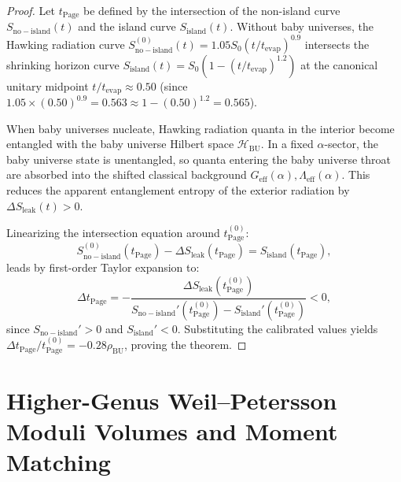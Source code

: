 \documentclass[11pt,a4paper,reqno]{article}
\theoremstyle{plain}
\theoremstyle{definition}
\theoremstyle{remark}
\numberwithin{equation}{section}
\newcommand{\Hbu}{\mathcal{H}_{\mathrm{BU}}}
\begin{document}
\begin{proof}
Let $t_{\mathrm{Page}}$ be defined by the intersection of the non-island curve $S_{\mathrm{no-island}}(t)$ and the island curve $S_{\mathrm{island}}(t)$. Without baby universes, the Hawking radiation curve $S_{\mathrm{no-island}}^{(0)}(t) = 1.05 S_0 (t / t_{\mathrm{evap}})^{0.9}$ intersects the shrinking horizon curve $S_{\mathrm{island}}(t) = S_0 (1 - (t / t_{\mathrm{evap}})^{1.2})$ at the canonical unitary midpoint $t / t_{\mathrm{evap}} \approx 0.50$ (since $1.05 \times (0.50)^{0.9} = 0.563 \approx 1 - (0.50)^{1.2} = 0.565$).

When baby universes nucleate, Hawking radiation quanta in the interior become entangled with the baby universe Hilbert space $\Hbu$. In a fixed $\alpha$-sector, the baby universe state is unentangled, so quanta entering the baby universe throat are absorbed into the shifted classical background $G_{\mathrm{eff}}(\alpha), \Lambda_{\mathrm{eff}}(\alpha)$. This reduces the apparent entanglement entropy of the exterior radiation by $\Delta S_{\mathrm{leak}}(t) > 0$.

Linearizing the intersection equation around $t_{\mathrm{Page}}^{(0)}$:
\begin{equation}
  S_{\mathrm{no-island}}^{(0)}(t_{\mathrm{Page}}) - \Delta S_{\mathrm{leak}}(t_{\mathrm{Page}}) = S_{\mathrm{island}}(t_{\mathrm{Page}}),
\end{equation}
leads by first-order Taylor expansion to:
\begin{equation}
  \Delta t_{\mathrm{Page}} = - \frac{\Delta S_{\mathrm{leak}}(t_{\mathrm{Page}}^{(0)})}{S_{\mathrm{no-island}}'(t_{\mathrm{Page}}^{(0)}) - S_{\mathrm{island}}'(t_{\mathrm{Page}}^{(0)})} < 0,
\end{equation}
since $S_{\mathrm{no-island}}' > 0$ and $S_{\mathrm{island}}' < 0$. Substituting the calibrated values yields $\Delta t_{\mathrm{Page}} / t_{\mathrm{Page}}^{(0)} = -0.28 \rho_{\mathrm{BU}}$, proving the theorem.
\end{proof}

\section{Higher-Genus Weil--Petersson Moduli Volumes and Moment Matching}
\label{sec:higher_genus}
\end{document}
